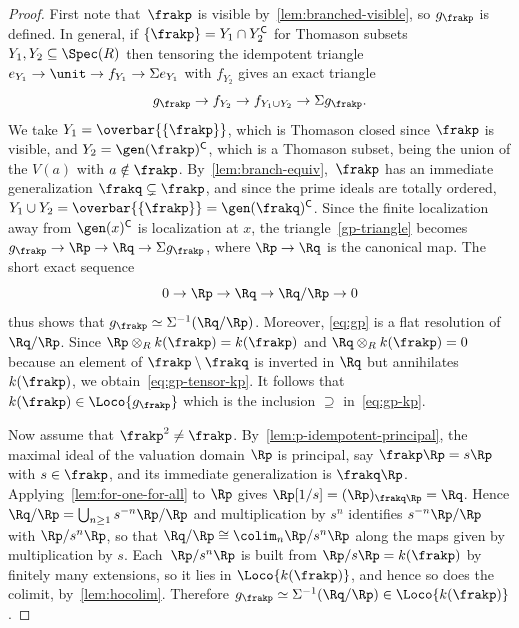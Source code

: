 \documentclass{amsart}
\numberwithin{equation}{section}%
\theoremstyle{remark}
\renewcommand{\complement}{{\mkern-1mu\mathsf{C}}}
\renewcommand{\complement}{{\mathsf{C}}}
\begin{document}
\begin{proof}
	First note that~$\frakp$ is visible by~\cref{lem:branched-visible}, so $g_\frakp$ is defined. In general, if $\{\frakp\} = Y_1 \cap Y_2^\complement$ for Thomason subsets $Y_1, Y_2 \subseteq \Spec(R)$ then tensoring the idempotent triangle $e_{Y_1} \to \unit \to f_{Y_1} \to \Sigma e_{Y_1}$ with $f_{Y_2}$ gives an exact triangle
	\begin{equation}\label{gp-triangle}
		g_\frakp \to f_{Y_2} \to f_{Y_1 \cup Y_2} \to \Sigma g_\frakp.
	\end{equation}
	We take $Y_1 = \overbar{\{\frakp\}}$, which is Thomason closed since $\frakp$ is visible, and $Y_2 = \gen(\frakp)^\complement$, which is a Thomason subset, being the union of the $V(a)$ with $a \notin \frakp$. By~\cref{lem:branch-equiv},~$\frakp$ has an immediate generalization $\frakq \subsetneq \frakp$, and since the prime ideals are totally ordered, $Y_1 \cup Y_2 = \overbar{\{\frakp\}} = \gen(\frakq)^\complement$. Since the finite localization away from $\gen(x)^\complement$ is localization at $x$, the triangle~\eqref{gp-triangle} becomes $g_\frakp \to \Rp \to \Rq \to \Sigma g_\frakp$, where $\Rp \to \Rq$ is the canonical map. The short exact sequence
	\begin{equation}\label{eq:gp}
		0 \to \Rp \to \Rq \to \Rq/\Rp \to 0
	\end{equation}
	thus shows that $g_\frakp \simeq \Sigma^{-1}(\Rq/\Rp)$. Moreover, \eqref{eq:gp} is a flat resolution of $\Rq/\Rp$. Since $\Rp \otimes_R k(\frakp) = k(\frakp)$ and $\Rq \otimes_R k(\frakp) = 0$ because an element of $\frakp \setminus \frakq$ is inverted in $\Rq$ but annihilates $k(\frakp)$, we obtain~\eqref{eq:gp-tensor-kp}. It follows that $k(\frakp) \in \Loco{g_\frakp}$ which is the inclusion $\supseteq$ in~\eqref{eq:gp-kp}.

	Now assume that $\frakp^2 \neq \frakp$. By~\cref{lem:p-idempotent-principal}, the maximal ideal of the valuation domain $\Rp$ is principal, say $\frakp\Rp = s\Rp$ with $s \in \frakp$, and its immediate generalization is $\frakq\Rp$. Applying~\cref{lem:for-one-for-all} to $\Rp$ gives $\Rp[1/s] = (\Rp)_{\frakq\Rp} = \Rq$. Hence $\Rq/\Rp = \bigcup_{n \ge 1} s^{-n}\Rp/\Rp$ and multiplication by $s^n$ identifies $s^{-n}\Rp/\Rp$ with $\Rp/s^n\Rp$, so that $\Rq/\Rp \cong \colim_n \Rp/s^n\Rp$ along the maps given by multiplication by $s$. Each~$\Rp/s^n\Rp$ is built from $\Rp/s\Rp = k(\frakp)$ by finitely many extensions, so it lies in $\Loco{k(\frakp)}$, and hence so does the colimit, by~\cref{lem:hocolim}. Therefore $g_\frakp \simeq \Sigma^{-1}(\Rq/\Rp) \in \Loco{k(\frakp)}$.
\end{proof}
\end{document}
